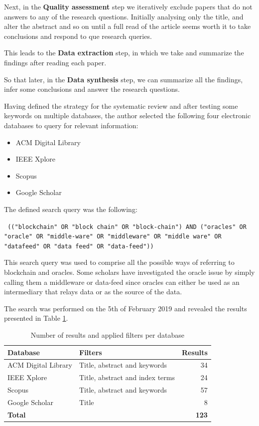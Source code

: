 Next, in the \textbf{Quality assessment} step we iteratively exclude papers that do not answers to any of the research questions. Initially analysing only the title, and alter the abstract and so on until a full read of the article seems worth it to take conclusions and respond to que research queries.

This leads to the \textbf{Data extraction} step, in which we take and summarize the findings after reading each paper.

So that later, in the \textbf{Data synthesis} step, we can summarize all the findings, infer some conclusions and answer the research questions.

Having defined the strategy for the systematic review and after testing some keywords on multiple databases, the author selected the following four electronic databases to query for relevant information:

\begin{itemize}
  \item ACM Digital Library
  \item IEEE Xplore
  \item Scopus
  \item Google Scholar
\end{itemize}


The defined search query was the following:

\texttt{
  (("blockchain" OR "block chain" OR "block-chain")
  AND
  ("oracles" OR "oracle" OR "middle-ware" OR "middleware" OR "middle ware" OR "datafeed" OR "data feed" OR "data-feed"))
}

This search query was used to comprise all the possible ways of referring to blockchain and oracles. Some scholars have investigated the oracle issue by simply calling them a middleware or data-feed since oracles can either be used as an intermediary that relays data or as the source of the data.

The search was performed on the 5th of February 2019 and revealed the results presented in Table \ref{search-results-table}.

\begin{table}[H]
  \centering
  \begin{tabular}{llr}
    \hline
    \textbf{Database}   & \textbf{Filters}                & \textbf{Results} \\ \hline
    ACM Digital Library & Title, abstract and keywords    & 34               \\
    IEEE Xplore         & Title, abstract and index terms & 24               \\
    Scopus              & Title, abstract and keywords    & 57               \\
    Google Scholar      & Title                           & 8                \\ \hline
    \textbf{Total}      & \textbf{}                       & \textbf{123}     \\ \hline
  \end{tabular}
  \caption{Number of results and applied filters per database}
  \label{search-results-table}
\end{table}

